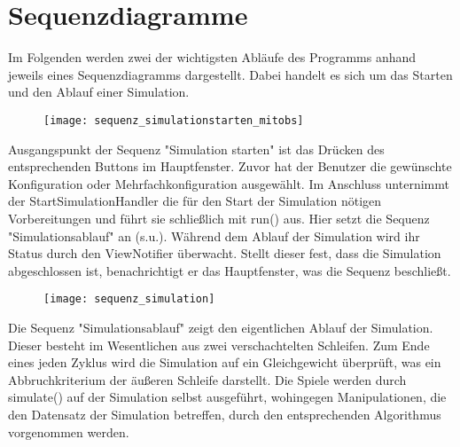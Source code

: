 \section{Sequenzdiagramme}

Im Folgenden werden zwei der wichtigsten Abläufe des Programms anhand jeweils eines Sequenzdiagramms dargestellt.
Dabei handelt es sich um das Starten und den Ablauf einer Simulation.

\begin{figure}[H]
{\centering 
\texttt{[image: sequenz\_simulationstarten\_mitobs]}}
\bigskip
\end{figure}

Ausgangspunkt der Sequenz "Simulation starten" ist das Drücken des entsprechenden Buttons im Hauptfenster. Zuvor hat der Benutzer die gewünschte Konfiguration oder Mehrfachkonfiguration ausgewählt.
Im Anschluss unternimmt der StartSimulationHandler die für den Start der Simulation nötigen Vorbereitungen und führt sie schließlich mit run() aus.
Hier setzt die Sequenz "Simulationsablauf" an (s.u.).
Während dem Ablauf der Simulation wird ihr Status durch den ViewNotifier überwacht. Stellt dieser fest, dass die Simulation abgeschlossen ist, benachrichtigt er das Hauptfenster, was die Sequenz beschließt.


\begin{figure}[H]
{\centering 
\texttt{[image: sequenz\_simulation]}}
\bigskip
\end{figure}


Die Sequenz "Simulationsablauf" zeigt den eigentlichen Ablauf der Simulation. Dieser besteht im Wesentlichen aus zwei verschachtelten Schleifen. Zum Ende eines jeden Zyklus wird die Simulation auf ein Gleichgewicht überprüft, was ein Abbruchkriterium der äußeren Schleife darstellt.
Die Spiele werden durch simulate() auf der Simulation selbst ausgeführt, wohingegen Manipulationen, die den Datensatz der Simulation betreffen, durch den entsprechenden Algorithmus vorgenommen werden.





